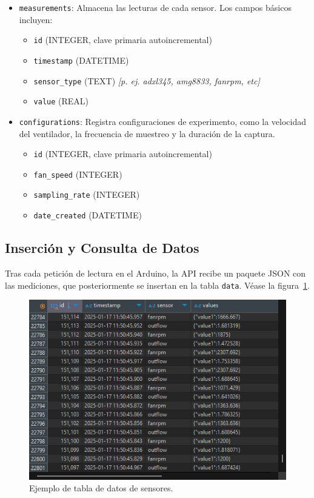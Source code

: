 \begin{itemize}
    \item \texttt{measurements}: Almacena las lecturas de cada sensor. Los campos básicos incluyen:
    \begin{itemize}
        \item \texttt{id} (INTEGER, clave primaria autoincremental)
        \item \texttt{timestamp} (DATETIME)
        \item \texttt{sensor\_type} (TEXT) \textit{[p. ej. adxl345, amg8833, fanrpm, etc]}
        \item \texttt{value} (REAL)
    \end{itemize}
    
    \item \texttt{configurations}: Registra configuraciones de experimento, como la velocidad del ventilador, la frecuencia de muestreo y la duración de la captura.
    \begin{itemize}
        \item \texttt{id} (INTEGER, clave primaria autoincremental)
        \item \texttt{fan\_speed} (INTEGER)
        \item \texttt{sampling\_rate} (INTEGER)
        \item \texttt{date\_created} (DATETIME)
    \end{itemize}
\end{itemize}

\subsection{Inserción y Consulta de Datos}
Tras cada petición de lectura en el Arduino, la API recibe un paquete JSON con las mediciones, que posteriormente se insertan en la tabla \texttt{data}. Véase la figura~\ref{fig:table}.

\begin{figure}[!ht]
    \centering
    \includegraphics[width=0.5\linewidth]{images/table.png}
    \caption{Ejemplo de tabla de datos de sensores.}
    \label{fig:table}
\end{figure}

